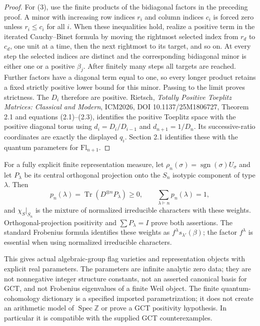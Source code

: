 \begin{proof}
For (3), use the finite products of the bidiagonal factors in the
preceding proof. A minor with increasing row indices $r_i$ and column
indices $c_i$ is forced zero unless $r_i\le c_i$ for all $i$.
When these inequalities hold, realize a positive term in the iterated
Cauchy--Binet formula by moving the rightmost selected index from $r_d$
to $c_d$, one unit at a time, then the next rightmost to its target,
and so on. At every step the selected indices are distinct and the
corresponding bidiagonal minor is either one or a positive $\beta_j$.
After finitely many steps all targets are reached. Further factors
have a diagonal term equal to one, so every longer product retains a
fixed strictly positive lower bound for this minor. Passing to the
limit proves strictness. The $D_i$ therefore are positive.
Rietsch, \emph{Totally Positive Toeplitz Matrices: Classical and Modern},
ICM2026, DOI 10.1137/25M1806727, Theorem 2.1 and equations (2.1)--(2.3),
identifies the positive Toeplitz space with the positive diagonal torus
using $d_i=D_i/D_{i-1}$ and $d_{n+1}=1/D_n$. Its successive-ratio
coordinates are exactly the displayed $q_i$. Section 2.1 identifies
these with the quantum parameters for $\mathrm{Fl}_{n+1}$.
\end{proof}

For a fully explicit finite representation measure, let
$\rho_n(\sigma)=\operatorname{sgn}(\sigma)U_\sigma$ and let
$P_\lambda$ be its central orthogonal projection onto the $S_n$
isotypic component of type $\lambda$. Then
\[
 p_n(\lambda)=\operatorname{Tr}(D^{\otimes n}P_\lambda)\ge0,
 \qquad\sum_{\lambda\vdash n}p_n(\lambda)=1,
\]
and $\chi_S|_{S_n}$ is the mixture of normalized irreducible
characters with these weights. Orthogonal-projection positivity and
$\sum P_\lambda=I$ prove both assertions. The standard Frobenius formula
identifies these weights as $f^\lambda s_{\lambda'}(\beta)$; the
factor $f^\lambda$ is essential when using normalized irreducible
characters.

This gives actual algebraic-group flag varieties and representation
objects with explicit real parameters. The parameters are infinite
analytic zero data; they are not nonnegative integer structure constants,
not an asserted canonical basis for GCT, and not Frobenius eigenvalues
of a finite Weil object. The finite quantum-cohomology dictionary is a
specified imported parametrization; it does not create an arithmetic
model of $\operatorname{Spec}\mathbb Z$ or prove a GCT positivity
hypothesis. In particular it is compatible with the supplied GCT
counterexamples.


